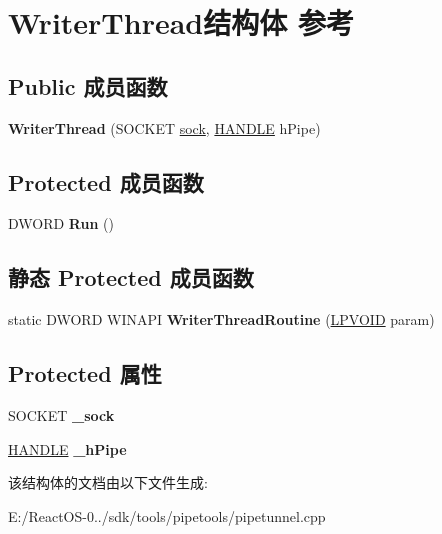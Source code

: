\hypertarget{struct_writer_thread}{}\section{Writer\+Thread结构体 参考}
\label{struct_writer_thread}
\subsection*{Public 成员函数}
\begin{DoxyCompactItemize}
\item 
\mbox{\label{struct_writer_thread_a6af6e658bb738ab120db05ac7b7ff5e6}} 
{\bfseries Writer\+Thread} (S\+O\+C\+K\+ET \hyperlink{structsock}{sock}, \hyperlink{interfacevoid}{H\+A\+N\+D\+LE} h\+Pipe)
\end{DoxyCompactItemize}
\subsection*{Protected 成员函数}
\begin{DoxyCompactItemize}
\item 
\mbox{\label{struct_writer_thread_aa2d9e319a1619af1bf252644a91cc12e}} 
D\+W\+O\+RD {\bfseries Run} ()
\end{DoxyCompactItemize}
\subsection*{静态 Protected 成员函数}
\begin{DoxyCompactItemize}
\item 
\mbox{\label{struct_writer_thread_a9a793ee0fe1468f066a2204433480dcd}} 
static D\+W\+O\+RD W\+I\+N\+A\+PI {\bfseries Writer\+Thread\+Routine} (\hyperlink{interfacevoid}{L\+P\+V\+O\+ID} param)
\end{DoxyCompactItemize}
\subsection*{Protected 属性}
\begin{DoxyCompactItemize}
\item 
\mbox{\label{struct_writer_thread_a2012780f0052cea0887dae85c6b3419a}} 
S\+O\+C\+K\+ET {\bfseries \+\_\+sock}
\item 
\mbox{\label{struct_writer_thread_af28586d6f9627b94db58570d32ba42c6}} 
\hyperlink{interfacevoid}{H\+A\+N\+D\+LE} {\bfseries \+\_\+h\+Pipe}
\end{DoxyCompactItemize}


该结构体的文档由以下文件生成\+:\begin{DoxyCompactItemize}
\item 
E\+:/\+React\+O\+S-\/0../sdk/tools/pipetools/pipetunnel.\+cpp\end{DoxyCompactItemize}
